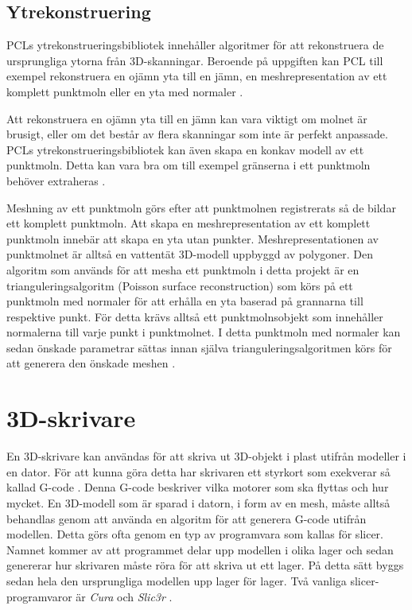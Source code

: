 \subsection{Ytrekonstruering}
PCLs ytrekonstrueringsbibliotek innehåller algoritmer för att rekonstruera de ursprungliga ytorna från 3D-skanningar. Beroende på uppgiften kan PCL till exempel rekonstruera en ojämn yta till en jämn, en meshrepresentation av ett komplett punktmoln eller en yta med normaler \cite{pcl_surface_reconstruction}.

Att rekonstruera en ojämn yta till en jämn kan vara viktigt om molnet är brusigt, eller om det består av flera skanningar som inte är perfekt anpassade. PCLs ytrekonstrueringsbibliotek kan även skapa en konkav modell av ett punktmoln. Detta kan vara bra om till exempel gränserna i ett punktmoln behöver extraheras \cite{pcl_surface_reconstruction}.

Meshning av ett punktmoln görs efter att punktmolnen registrerats så de bildar ett komplett punktmoln. Att skapa en meshrepresentation av ett komplett punktmoln innebär att skapa en yta utan punkter. Meshrepresentationen av punktmolnet är alltså en vattentät 3D-modell uppbyggd av polygoner. Den algoritm som används för att mesha ett punktmoln i detta projekt är en trianguleringsalgoritm (Poisson surface reconstruction) som körs på ett punktmoln med normaler för att erhålla en yta baserad på grannarna till respektive punkt. För detta krävs alltså ett punktmolnsobjekt som innehåller normalerna till varje punkt i punktmolnet. I detta punktmoln med normaler kan sedan önskade parametrar sättas innan själva trianguleringsalgoritmen körs för att generera den önskade meshen \cite{pcl_surface_reconstruction}\cite{pcl_triangulation_algorithm}. 


\section{3D-skrivare}
En 3D-skrivare kan användas för att skriva ut 3D-objekt i plast utifrån modeller i en dator. För att kunna göra detta har skrivaren ett styrkort som exekverar så kallad G-code \cite{gcode}. Denna G-code beskriver vilka motorer som ska flyttas och hur mycket. En 3D-modell som är sparad i datorn, i form av en mesh, måste alltså behandlas genom att använda en algoritm för att generera G-code utifrån modellen. Detta görs ofta genom en typ av programvara som kallas för slicer. Namnet kommer av att programmet delar upp modellen i olika lager och sedan genererar hur skrivaren måste röra för att skriva ut ett lager. På detta sätt byggs sedan hela den ursprungliga modellen upp lager för lager. Två vanliga slicer-programvaror är \textit{Cura} \cite{cura} och \textit{Slic3r} \cite{slic3r}.

